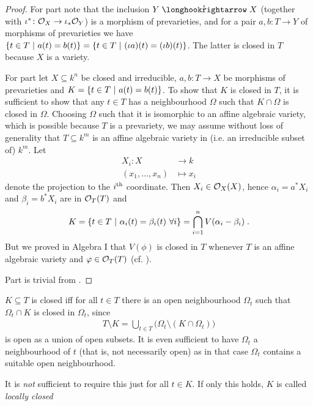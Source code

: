 \documentclass[a4paper,parskip=half,numbers=enddot, DIV=12]{scrreprt}
\begin{document}
\begin{proof}
		For part  note that the inclusion $Y\monomorphism[\iota] X$ (together with $\iota^*\colon \mathcal{O}_X\to\iota_*\mathcal{O}_Y$) is a morphism of prevarieties, and for a pair $a,b\colon T\to Y$ of morphisms of prevarieties we have $\left\{t\in T\ \middle|\  a(t) = b(t) \right\} = \left\{t \in T\ \middle|\ (\iota a)(t) = (\iota b)(t) \right\}$. The latter is closed in $T$ because $X$ is a variety.
	
        For part  let $X\subseteq k^n$ be closed and irreducible, $a,b\colon T\to X$ be morphisms of prevarieties and $K= \left\{t\in T\ \middle|\  a(t) = b(t)\right\}$. To show that $K$ is closed in $T$, it is sufficient to show that any $t\in T$ has a neighbourhood $\Omega$ such that $K\cap \Omega$ is closed in $\Omega$. Choosing $\Omega$ such that it is isomorphic to an affine algebraic variety, which is possible because $T$ is a prevariety, we may assume without loss of generality that $T\subseteq k^m$ is an affine algebraic variety in (i.e.  an irreducible subset of) $k^m$. Let 
	        \begin{align*}
		    X_i\colon X&\longrightarrow k\\
		    (x_1,\ldots,x_n)&\longmapsto x_i
		\end{align*}
		denote the projection to the $i^{\text{th}}$ coordinate. Then $X_i\in\mathcal{O}_X(X)$, hence $\alpha_i = a^\ast X_i$ and $\beta_i = b^\ast X_i$ are in $\mathcal{O}_T(T)$ and 
		\begin{align}
		    K= \left\{ t\in T\ \middle|\  \alpha_i(t) = \beta_i(t)\ \forall i\right\} = \bigcap_{i=1}^n V(\alpha_i-\beta_i)\;.
		\end{align}
		But we proved in Algebra I that $V(\phi)$ is closed in $T$ whenever $T$ is an affine algebraic variety and $\varphi\in  \mathcal{O}_T(T)$ (cf. \cite[Proposition 2.2.1]{alg1}).
		
		Part  is trivial from .	
\end{proof}
\begin{rem}
    \begin{alphanumerate}
    \item {}
        $K\subseteq T$ is closed iff for all $t\in T$ there is an open neighbourhood $\Omega_t$ such that $\Omega_t\cap K$ is closed in $\Omega_t$, since 
        \begin{align*}
            T\setminus K = \bigcup_{t\in T} \big(\Omega_t\setminus (K\cap \Omega_t)\big)
        \end{align*}
        is open as a union of open subsets. It is even sufficient to have $\Omega_t$ a neighbourhood of $t$ (that is, not necessarily open) as in that case $\Omega_t$ contains a suitable open neighbourhood.
    \item
        It is \emph{not} sufficient to require this just for all $t\in K$. If only this holds, $K$ is called \emph{locally closed}
    \end{alphanumerate}
\end{rem}
\end{document}
